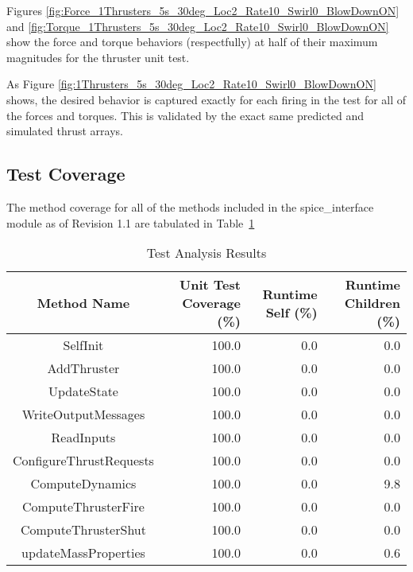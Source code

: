 \begin{enumerate}
	Figures \ref{fig:Force_1Thrusters_5s_30deg_Loc2_Rate10_Swirl0_BlowDownON} and \ref{fig:Torque_1Thrusters_5s_30deg_Loc2_Rate10_Swirl0_BlowDownON} show the force and torque behaviors (respectfully) at half of their maximum magnitudes for the thruster unit test.

	
	
	

	As Figure \ref{fig:1Thrusters_5s_30deg_Loc2_Rate10_Swirl0_BlowDownON} shows, the desired behavior is captured exactly for each
	firing in the test for all of the forces and torques. This is validated by the exact same predicted and simulated thrust arrays.



\end{enumerate}




\subsection{Test Coverage}
The method coverage for all of the methods included in the spice\_interface
module as of Revision 1.1 are tabulated in Table~\ref{tab:cov_met}

\begin{table}[htbp]
	\caption{Test Analysis Results}
	\label{tab:cov_met}
	\centering \fontsize{10}{10}\selectfont
	\begin{tabular}{c | r | r | r} %
		\hline
		Method Name    & Unit Test Coverage (\%) & Runtime Self (\%) & Runtime Children (\%) \\
		\hline
		SelfInit & 100.0 & 0.0 & 0.0 \\
		AddThruster & 100.0 & 0.0 & 0.0 \\
		UpdateState & 100.0 & 0.0 & 0.0 \\
		WriteOutputMessages & 100.0 & 0.0 & 0.0 \\
		ReadInputs & 100.0 & 0.0 & 0.0 \\
		ConfigureThrustRequests & 100.0 & 0.0 & 0.0 \\
		ComputeDynamics & 100.0 & 0.0 & 9.8 \\
		ComputeThrusterFire & 100.0 & 0.0 & 0.0 \\
		ComputeThrusterShut & 100.0 & 0.0 & 0.0 \\
		updateMassProperties & 100.0 & 0.0 & 0.6 \\
		\hline
	\end{tabular}
\end{table}

